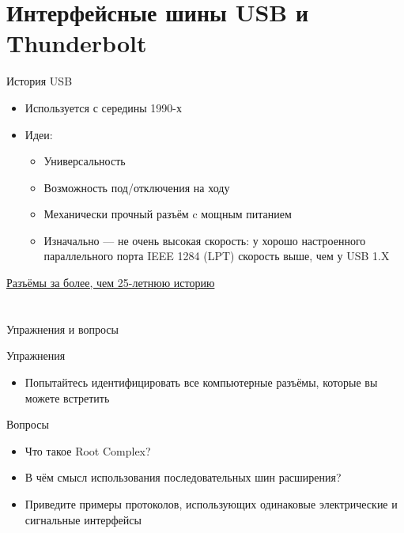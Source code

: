\documentclass[xetex,aspectratio=43]{beamer}
\begin{document}
\section{Интерфейсные шины USB и Thunderbolt}

\begin{frame}{История USB}

\begin{itemize}
    \item Используется с середины 1990-х
    \item Идеи:
    \begin{itemize}
        \item Универсальность
        \item Возможность под/отключения на ходу
        \item Механически прочный разъём c мощным питанием
        \item Изначально — не очень высокая скорость: у хорошо настроенного параллельного порта IEEE 1284 (LPT) скорость выше, чем у USB 1.X
    \end{itemize}
\end{itemize}
\pause
\href{https://en.wikipedia.org/wiki/USB\#Connector_type_quick_reference}{Разъёмы за более, чем 25-летнюю историю}

\end{frame}

\section*{}

\begin{frame}{Упражнения и вопросы}
	\begin{block}{Упражнения}
		\begin{itemize}
			\tightlist
			\item
			Попытайтесь идентифицировать все компьютерные разъёмы, которые вы можете встретить
		\end{itemize}
	\end{block}

	\begin{block}{Вопросы}
		\begin{itemize}
			\tightlist
            \item
            Что такое Root Complex?
            \item
            В чём смысл использования последовательных шин расширения?
            \item
            Приведите примеры протоколов, использующих одинаковые электрические и сигнальные интерфейсы
		\end{itemize}
	\end{block}
\end{frame}

\postamble
\end{document}
